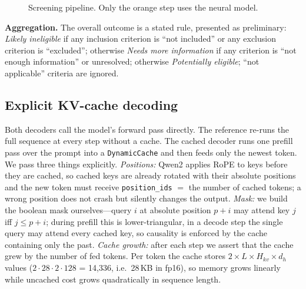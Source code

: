 \documentclass[conference]{IEEEtran}
\begin{document}
\begin{figure}[t]
\centering
{}
\caption{Screening pipeline. Only the orange step uses the neural model.}
\label{fig:arch}
\end{figure}

\textbf{Aggregation.} The overall outcome is a stated rule, presented as preliminary: \emph{Likely ineligible} if any inclusion criterion is ``not included'' or any exclusion criterion is ``excluded''; otherwise \emph{Needs more information} if any criterion is ``not enough information'' or unresolved; otherwise \emph{Potentially eligible}; ``not applicable'' criteria are ignored.

\subsection{Explicit KV-cache decoding}
Both decoders call the model's forward pass directly. The reference re-runs the full sequence at every step without a cache. The cached decoder runs one prefill pass over the prompt into a \texttt{DynamicCache} and then feeds only the newest token. We pass three things explicitly. \emph{Positions:} Qwen2 applies RoPE to keys before they are cached, so cached keys are already rotated with their absolute positions and the new token must receive \texttt{position\_ids} $=$ the number of cached tokens; a wrong position does not crash but silently changes the output. \emph{Mask:} we build the boolean mask ourselves---query $i$ at absolute position $p+i$ may attend key $j$ iff $j\le p+i$; during prefill this is lower-triangular, in a decode step the single query may attend every cached key, so causality is enforced by the cache containing only the past. \emph{Cache growth:} after each step we assert that the cache grew by the number of fed tokens. Per token the cache stores $2\times L\times H_{kv}\times d_h$ values ($2\cdot28\cdot2\cdot128$ = 14{,}336, i.e.\ 28\,KB in fp16), so memory grows linearly while uncached cost grows quadratically in sequence length.
\end{document}
